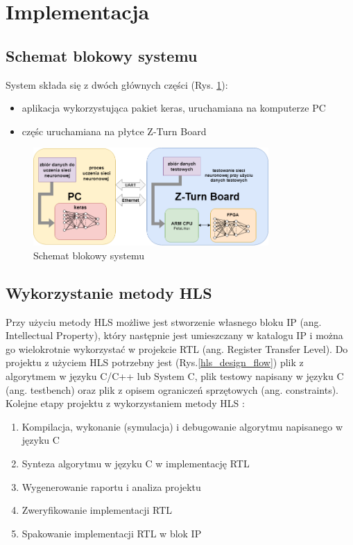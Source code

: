 \newpage %
\cleardoublepage %
\pagestyle{headings}

\section{Implementacja}

\subsection{Schemat blokowy systemu}

System składa się z dwóch głównych części (Rys. \ref{schemat_blokowy}):
\begin{itemize}
  \item aplikacja wykorzystująca pakiet keras, uruchamiana na komputerze PC
  \item częśc uruchamiana na płytce Z-Turn Board
\end{itemize}

\begin{figure}[h]
  \centering
  \includegraphics[width=0.8\textwidth]{img/schemat_blokowy.png}
  \caption{Schemat blokowy systemu}
  \label{schemat_blokowy}
\end{figure}


\subsection{Wykorzystanie metody HLS}
Przy użyciu metody HLS możliwe jest stworzenie własnego bloku IP (ang. Intellectual Property), który następnie jest umieszczany w katalogu IP i można go wielokrotnie wykorzystać w projekcie RTL (ang. Register Transfer Level).
Do projektu z użyciem HLS potrzebny jest (Rys.\ref{hls_design_flow}) plik z algorytmem w języku C/C++ lub System C, plik testowy napisany w języku C (ang. testbench) oraz plik z opisem ograniczeń sprzętowych (ang. constraints).
Kolejne etapy projektu z wykorzystaniem metody HLS \cite{hlsXilinxGuide}:

\begin{enumerate}
    \item Kompilacja, wykonanie (symulacja) i debugowanie algorytmu napisanego w języku C
    \item Synteza algorytmu w języku C w implementację RTL
    \item Wygenerowanie raportu i analiza projektu
    \item Zweryfikowanie implementacji RTL
    \item Spakowanie implementacji RTL w blok IP
\end{enumerate}


